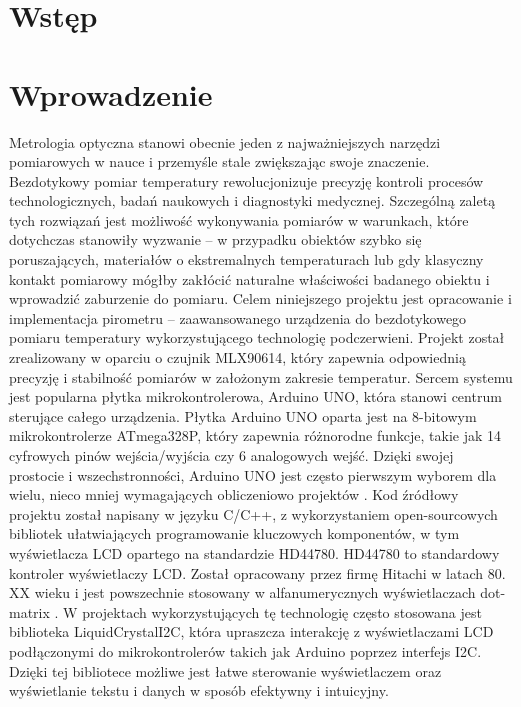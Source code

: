\chapter{Wstęp}
    \chapter{Wprowadzenie}
    Metrologia optyczna stanowi obecnie jeden z najważniejszych narzędzi pomiarowych w nauce i przemyśle stale zwiększając swoje znaczenie. Bezdotykowy pomiar temperatury rewolucjonizuje precyzję kontroli procesów technologicznych, badań naukowych i diagnostyki medycznej. Szczególną zaletą tych rozwiązań jest możliwość wykonywania pomiarów w warunkach, które dotychczas stanowiły wyzwanie – w przypadku obiektów szybko się poruszających, materiałów o ekstremalnych temperaturach lub gdy klasyczny kontakt pomiarowy mógłby zakłócić naturalne właściwości badanego obiektu i wprowadzić zaburzenie do pomiaru.
    Celem niniejszego projektu jest opracowanie i implementacja pirometru – zaawansowanego urządzenia do bezdotykowego pomiaru temperatury wykorzystującego technologię podczerwieni. Projekt został zrealizowany w oparciu o czujnik MLX90614, który zapewnia odpowiednią precyzję i stabilność pomiarów w założonym zakresie temperatur. Sercem systemu jest popularna płytka mikrokontrolerowa, Arduino UNO, która stanowi centrum sterujące całego urządzenia. Płytka Arduino UNO oparta jest na 8-bitowym mikrokontrolerze ATmega328P, który zapewnia różnorodne funkcje, takie jak 14 cyfrowych pinów wejścia/wyjścia czy 6 analogowych wejść. Dzięki swojej prostocie i wszechstronności, Arduino UNO jest często pierwszym wyborem dla wielu, nieco mniej wymagających obliczeniowo projektów \cite{1}. Kod źródłowy projektu został napisany w języku C/C++, z wykorzystaniem open-sourcowych bibliotek ułatwiających programowanie kluczowych komponentów, w tym wyświetlacza LCD opartego na standardzie HD44780. HD44780 to standardowy kontroler wyświetlaczy LCD. Został opracowany przez firmę Hitachi w latach 80. XX wieku i jest powszechnie stosowany w alfanumerycznych wyświetlaczach dot-matrix \cite{2}. W projektach wykorzystujących tę technologię często stosowana jest biblioteka LiquidCrystalI2C, która upraszcza interakcję z wyświetlaczami LCD podłączonymi do mikrokontrolerów takich jak Arduino poprzez interfejs I2C. Dzięki tej bibliotece możliwe jest łatwe sterowanie wyświetlaczem oraz wyświetlanie tekstu i danych w sposób efektywny i intuicyjny. 

